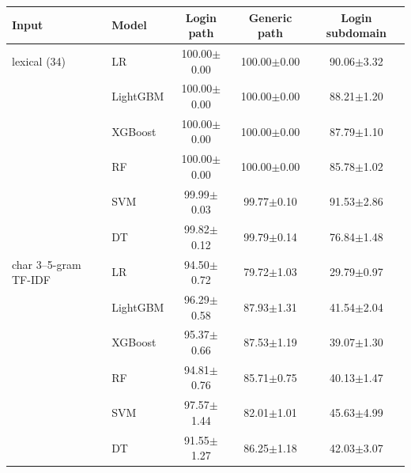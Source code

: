 \begin{tabular}{@{}llccc@{}}
\toprule
\textbf{Input} & \textbf{Model} & \textbf{Login path} & \textbf{Generic path} & \textbf{Login subdomain}\\
\midrule
lexical (34) & LR & 100.00{\tiny$\pm$0.00} & 100.00{\tiny$\pm$0.00} & 90.06{\tiny$\pm$3.32}\\
 & LightGBM & 100.00{\tiny$\pm$0.00} & 100.00{\tiny$\pm$0.00} & 88.21{\tiny$\pm$1.20}\\
 & XGBoost & 100.00{\tiny$\pm$0.00} & 100.00{\tiny$\pm$0.00} & 87.79{\tiny$\pm$1.10}\\
 & RF & 100.00{\tiny$\pm$0.00} & 100.00{\tiny$\pm$0.00} & 85.78{\tiny$\pm$1.02}\\
 & SVM & 99.99{\tiny$\pm$0.03} & 99.77{\tiny$\pm$0.10} & 91.53{\tiny$\pm$2.86}\\
 & DT & 99.82{\tiny$\pm$0.12} & 99.79{\tiny$\pm$0.14} & 76.84{\tiny$\pm$1.48}\\
\midrule
char 3--5-gram TF-IDF & LR & 94.50{\tiny$\pm$0.72} & 79.72{\tiny$\pm$1.03} & 29.79{\tiny$\pm$0.97}\\
 & LightGBM & 96.29{\tiny$\pm$0.58} & 87.93{\tiny$\pm$1.31} & 41.54{\tiny$\pm$2.04}\\
 & XGBoost & 95.37{\tiny$\pm$0.66} & 87.53{\tiny$\pm$1.19} & 39.07{\tiny$\pm$1.30}\\
 & RF & 94.81{\tiny$\pm$0.76} & 85.71{\tiny$\pm$0.75} & 40.13{\tiny$\pm$1.47}\\
 & SVM & 97.57{\tiny$\pm$1.44} & 82.01{\tiny$\pm$1.01} & 45.63{\tiny$\pm$4.99}\\
 & DT & 91.55{\tiny$\pm$1.27} & 86.25{\tiny$\pm$1.18} & 42.03{\tiny$\pm$3.07}\\
\bottomrule
\end{tabular}